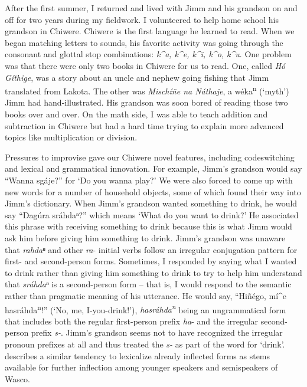 \documentclass[output=paper]{LSP/langsci}
\begin{document}
After the first summer, I returned and lived with Jimm and his grandson on and off for two years during my fieldwork. I volunteered to help home school his grandson in Chiwere. Chiwere is the first language he learned to read. When we began matching letters to sounds, his favorite activity was going through the consonant and glottal stop combinations: \emph{k\^{ }a, k\^{ }e, k\^{ }i, k\^{ }o, k\^{ }u}. One problem was that there were only two books in Chiwere for us to read. One, called \emph{H\'o G\'ithige}, was a story about an uncle and nephew going fishing that Jimm translated from Lakota. The other was \emph{Misch\'i\~ne na N\'athaje}, a w\'eka\textsuperscript{n} (`myth') Jimm had hand-illustrated. His grandson was soon bored of reading those two books over and over. On the math side, I was able to teach addition and subtraction in Chiwere but had a hard time trying to explain more advanced topics like multiplication or division.

Pressures to improvise gave our Chiwere novel features, including codeswitching and lexical and grammatical innovation. For example, Jimm's grandson would say ``Wanna sg\'aje?'' for `Do you wanna play?' We were also forced to come up with new words for a number of household objects, some of which found their way into Jimm's dictionary. When Jimm's grandson wanted something to drink, he would say ``Dag\'ura sr\'ahdaⁿ?'' which means `What do you want to drink?' He associated this phrase with receiving something to drink because this is what Jimm would ask him before giving him something to drink. Jimm's grandson was unaware that \emph{rahdaⁿ} and other \emph{ra}- initial verbs follow an irregular conjugation pattern for first- and second-person forms. Sometimes, I responded by saying what I wanted to drink rather than giving him something to drink to try to help him understand that \emph{sr\'ahdaⁿ} is a second-person form -- that is, I would respond to the semantic rather than pragmatic meaning of his utterance. He would say, ``Hi\~n\'ego, m\'i\^{ }e hasr\'ahda\textsuperscript{n}!'' (`No, me, I-you-drink!'), \emph{hasr\'ahda\textsuperscript{n}} being an ungrammatical form that includes both the regular first-person prefix \emph{ha}- and the irregular second-person prefix \emph{s-}. Jimm's grandson seems not to have recognized the irregular pronoun prefixes at all and thus treated the \emph{s-} as part of the word for `drink'.  describes a similar tendency to lexicalize already inflected forms as stems available for further inflection among younger speakers and semispeakers of Wasco. 
\end{document}
